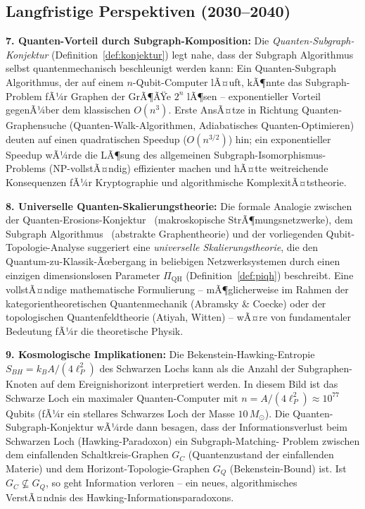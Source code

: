 ﻿\documentclass[a4paper,12pt]{article}
\theoremstyle{definition}
\begin{document}
\subsection{Langfristige Perspektiven (2030--2040)}

\textbf{7. Quanten-Vorteil durch Subgraph-Komposition:}
Die \emph{Quanten-Subgraph-Konjektur} (Definition~\ref{def:konjektur}) legt
nahe, dass der Subgraph Algorithmus selbst quantenmechanisch beschleunigt
werden kann: Ein Quanten-Subgraph Algorithmus, der auf einem $n$-Qubit-Computer
lÃ¤uft, kÃ¶nnte das Subgraph-Problem fÃ¼r Graphen der GrÃ¶ÃŸe $2^n$ lÃ¶sen --
exponentieller Vorteil gegenÃ¼ber dem klassischen $O(n^3)$. Erste AnsÃ¤tze
in Richtung Quanten-Graphensuche (Quanten-Walk-Algorithmen, Adiabatisches
Quanten-Optimieren) deuten auf einen quadratischen Speedup ($O(n^{3/2})$)
hin; ein exponentieller Speedup wÃ¼rde die LÃ¶sung des allgemeinen
Subgraph-Isomorphismus-Problems (NP-vollstÃ¤ndig) effizienter machen und
hÃ¤tte weitreichende Konsequenzen fÃ¼r Kryptographie und algorithmische
KomplexitÃ¤tstheorie.

\textbf{8. Universelle Quanten-Skalierungstheorie:}
Die formale Analogie zwischen der Quanten-Erosions-Konjektur~\cite{epp2026cnyn}
(makroskopische StrÃ¶mungsnetzwerke), dem Subgraph Algorithmus~\cite{epp2026subgraph}
(abstrakte Graphentheorie) und der vorliegenden Qubit-Topologie-Analyse suggeriert
eine \emph{universelle Skalierungstheorie}, die den Quantum-zu-Klassik-Ãœbergang
in beliebigen Netzwerksystemen durch einen einzigen dimensionslosen Parameter
$\Pi_\mathrm{QH}$ (Definition~\ref{def:piqh}) beschreibt. Eine vollstÃ¤ndige
mathematische Formulierung -- mÃ¶glicherweise im Rahmen der kategorientheoretischen
Quantenmechanik (Abramsky \& Coecke) oder der topologischen Quantenfeldtheorie
(Atiyah, Witten) -- wÃ¤re von fundamentaler Bedeutung fÃ¼r die theoretische Physik.

\textbf{9. Kosmologische Implikationen:}
Die Bekenstein-Hawking-Entropie $S_{BH} = k_B A/(4\ell_P^2)$ des Schwarzen Lochs
kann als die Anzahl der Subgraphen-Knoten auf dem Ereignishorizont interpretiert
werden. In diesem Bild ist das Schwarze Loch ein maximaler Quanten-Computer mit
$n = A/(4\ell_P^2) \approx 10^{77}$ Qubits (fÃ¼r ein stellares Schwarzes Loch der
Masse $10\,M_\odot$). Die Quanten-Subgraph-Konjektur wÃ¼rde dann besagen, dass der
Informationsverlust beim Schwarzen Loch (Hawking-Paradoxon) ein Subgraph-Matching-
Problem zwischen dem einfallenden Schaltkreis-Graphen $G_C$ (Quantenzustand der
einfallenden Materie) und dem Horizont-Topologie-Graphen $G_Q$ (Bekenstein-Bound)
ist. Ist $G_C \not\subseteq G_Q$, so geht Information verloren -- ein neues,
algorithmisches VerstÃ¤ndnis des Hawking-Informationsparadoxons.
\end{document}

